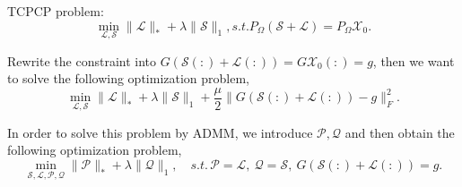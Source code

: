 \documentclass[a4paper,12pt]{article}
\theoremstyle{mystyle}
\begin{document}
\begin{CJK*}{GBK}{song}
\CJKindent          %
\CJKtilde           %


\pagestyle{MyPgsStylex}   %

\setlength\baselineskip{24pt}   %
\setlength{\parskip}{2pt}       %

\setlength{\abovedisplayskip}{2pt plus 2pt minus 4pt}
\setlength{\belowdisplayskip}{2pt plus 2pt minus 4pt}







\thispagestyle{empty}   %


\bigskip
\noindent TCPCP problem:
\begin{equation}\label{e1}
\min_{\mathcal{L},\mathcal{S}}\|\mathcal{L}\|_*+\lambda \|\mathcal{S}\|_1, s.t. P_{\Omega}(\mathcal{S+L})=P_{\Omega}\mathcal{X}_0.
\end{equation}

Rewrite the constraint into $G\mathcal{(S(:)+L(:))}=G\mathcal{X}_0(:)=g$, then we want to solve the following optimization problem,
\begin{equation}\label{e2}
\min_{\mathcal{L},\mathcal{S}}\|\mathcal{L}\|_*+\lambda \|\mathcal{S}\|_1+\frac{\mu}{2}\|G\mathcal{(S(:)+L(:))}-g\|_{F}^2.
\end{equation}

In order to solve this problem by ADMM, we introduce $\mathcal{P}, \mathcal{Q}$ and then obtain the following optimization problem,
\begin{equation}\label{e3}
\min_{\mathcal{S},\mathcal{L},\mathcal{P},\mathcal{Q}}\|\mathcal{P}
\|_*+\lambda \|\mathcal{Q}\|_1,
\quad s.t.\, \mathcal{P=L,~Q=S},~G\mathcal{(S(:)+L(:))}=g.
\end{equation}



\end{CJK*}
\end{document}
